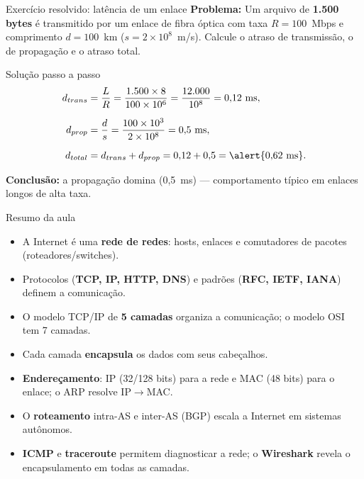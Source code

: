 \documentclass[aspectratio=169,11pt]{beamer}
\begin{document}
\begin{frame}{Exercício resolvido: latência de um enlace}
  \textbf{Problema:} Um arquivo de \textbf{1.500 bytes} é transmitido por um enlace de fibra óptica com taxa $R = 100$~Mbps e comprimento $d = 100$~km ($s = 2\times10^8$~m/s). Calcule o atraso de transmissão, o de propagação e o atraso total.
  \pause
  \begin{block}{Solução passo a passo}
    \begin{align*}
      d_{trans} &= \frac{L}{R} = \frac{1.500 \times 8}{100 \times 10^6}
      = \frac{12.000}{10^8} = 0{,}12~\text{ms},\\[2mm]
      d_{prop} &= \frac{d}{s} = \frac{100 \times 10^3}{2 \times 10^8}
      = 0{,}5~\text{ms},\\[2mm]
      d_{total} &= d_{trans} + d_{prop} = 0{,}12 + 0{,}5
      = \alert{0{,}62~\text{ms}}.
    \end{align*}
  \end{block}
  \pause
  \textbf{Conclusão:} a propagação domina (0,5~ms) --- comportamento típico em enlaces longos de alta taxa.
\end{frame}

\begin{frame}{Resumo da aula}
  \begin{itemize}
    \item A Internet é uma \textbf{rede de redes}: hosts, enlaces e comutadores de pacotes (roteadores/switches).
    \item Protocolos (\textbf{TCP, IP, HTTP, DNS}) e padrões (\textbf{RFC, IETF, IANA}) definem a comunicação.
    \item O modelo TCP/IP de \textbf{5 camadas} organiza a comunicação; o modelo OSI tem 7 camadas.
    \item Cada camada \textbf{encapsula} os dados com seus cabeçalhos.
    \item \textbf{Endereçamento}: IP (32/128 bits) para a rede e MAC (48 bits) para o enlace; o ARP resolve IP$\rightarrow$MAC.
    \item O \textbf{roteamento} intra-AS e inter-AS (BGP) escala a Internet em sistemas autônomos.
    \item \textbf{ICMP} e \textbf{traceroute} permitem diagnosticar a rede; o \textbf{Wireshark} revela o encapsulamento em todas as camadas.
  \end{itemize}
\end{frame}
\end{document}
